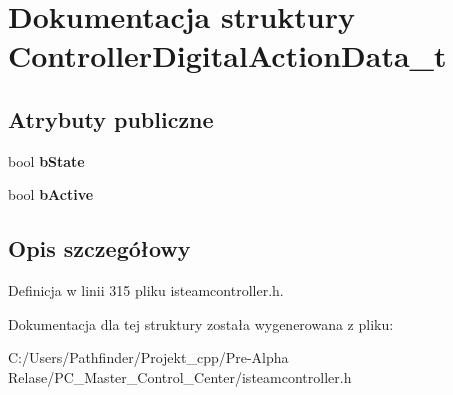 \hypertarget{struct_controller_digital_action_data__t}{}\section{Dokumentacja struktury Controller\+Digital\+Action\+Data\+\_\+t}
\label{struct_controller_digital_action_data__t}
\subsection*{Atrybuty publiczne}
\begin{DoxyCompactItemize}
\item 
\mbox{\label{struct_controller_digital_action_data__t_ae49adba550a2d3141c23e93ae2a2d798}} 
bool {\bfseries b\+State}
\item 
\mbox{\label{struct_controller_digital_action_data__t_a7dd3eea416582bdc8b41d1a904b7d5aa}} 
bool {\bfseries b\+Active}
\end{DoxyCompactItemize}


\subsection{Opis szczegółowy}


Definicja w linii 315 pliku isteamcontroller.\+h.



Dokumentacja dla tej struktury została wygenerowana z pliku\+:\begin{DoxyCompactItemize}
\item 
C\+:/\+Users/\+Pathfinder/\+Projekt\+\_\+cpp/\+Pre-\/\+Alpha Relase/\+P\+C\+\_\+\+Master\+\_\+\+Control\+\_\+\+Center/isteamcontroller.\+h\end{DoxyCompactItemize}
